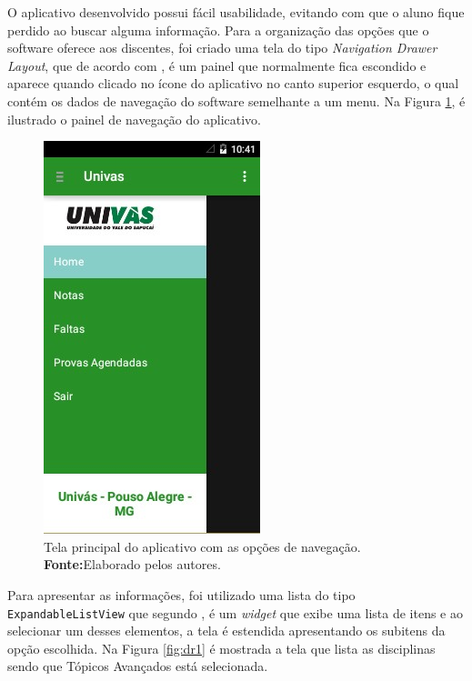     \par O aplicativo desenvolvido possui fácil usabilidade, evitando com que o
aluno fique perdido ao buscar alguma informação. Para a organização das opções
que o software oferece aos discentes, foi criado uma tela do tipo
\textit{Navigation Drawer Layout}, que de acordo com ,
é um painel que normalmente fica escondido e aparece quando clicado no ícone do
aplicativo no canto superior esquerdo, o qual contém os dados de navegação do
software semelhante a um menu. Na Figura \ref{fig:dr}, é ilustrado o painel de
navegação do aplicativo.
     
\begin{figure}[h!]
    \centerline{\includegraphics[scale=0.8]{./imagens/3_discussao_resultados/dr.jpg}}
    \caption[Tela principal do aplicativo com as opções de navegação]{Tela
    principal do aplicativo com as opções de navegação.
    \textbf{Fonte:}Elaborado pelos autores.}
    \label{fig:dr}
\end{figure}

    \par Para apresentar as informações, foi utilizado uma lista do tipo
\texttt{ExpandableListView} que segundo , é um
\textit{widget} que exibe uma lista de itens e ao selecionar um desses
elementos, a tela é estendida apresentando os subitens da opção escolhida. Na
Figura \ref{fig:dr1} é mostrada a tela que lista as disciplinas sendo que
Tópicos Avançados está selecionada.



